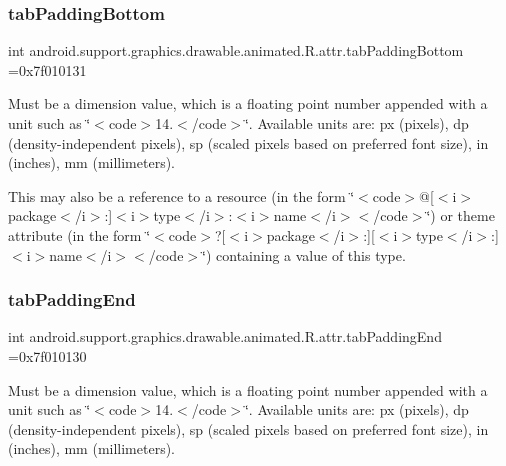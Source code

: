 \subsubsection{\texorpdfstring{tab\+Padding\+Bottom}{tabPaddingBottom}}
{\footnotesize\ttfamily int android.\+support.\+graphics.\+drawable.\+animated.\+R.\+attr.\+tab\+Padding\+Bottom =0x7f010131\hspace{0.3cm}{\ttfamily [static]}}

Must be a dimension value, which is a floating point number appended with a unit such as \char`\"{}$<$code$>$14.\+5sp$<$/code$>$\char`\"{}. Available units are\+: px (pixels), dp (density-\/independent pixels), sp (scaled pixels based on preferred font size), in (inches), mm (millimeters). 

This may also be a reference to a resource (in the form \char`\"{}$<$code$>$@\mbox{[}$<$i$>$package$<$/i$>$\+:\mbox{]}$<$i$>$type$<$/i$>$\+:$<$i$>$name$<$/i$>$$<$/code$>$\char`\"{}) or theme attribute (in the form \char`\"{}$<$code$>$?\mbox{[}$<$i$>$package$<$/i$>$\+:\mbox{]}\mbox{[}$<$i$>$type$<$/i$>$\+:\mbox{]}$<$i$>$name$<$/i$>$$<$/code$>$\char`\"{}) containing a value of this type. \mbox{\label{classandroid_1_1support_1_1graphics_1_1drawable_1_1animated_1_1R_1_1attr_ae4076fb0aea78d7ea13c7b80fbe92b80}} 
\subsubsection{\texorpdfstring{tab\+Padding\+End}{tabPaddingEnd}}
{\footnotesize\ttfamily int android.\+support.\+graphics.\+drawable.\+animated.\+R.\+attr.\+tab\+Padding\+End =0x7f010130\hspace{0.3cm}{\ttfamily [static]}}

Must be a dimension value, which is a floating point number appended with a unit such as \char`\"{}$<$code$>$14.\+5sp$<$/code$>$\char`\"{}. Available units are\+: px (pixels), dp (density-\/independent pixels), sp (scaled pixels based on preferred font size), in (inches), mm (millimeters). 

